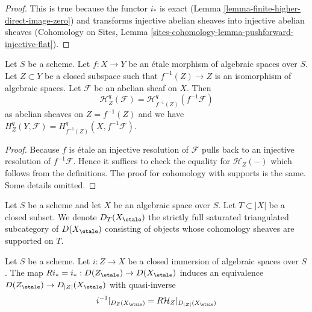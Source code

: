 \begin{proof}
This is true because the functor $i_*$ is exact
(Lemma \ref{lemma-finite-higher-direct-image-zero}) and transforms
injective abelian sheaves into injective abelian sheaves
(Cohomology on Sites, Lemma
\ref{sites-cohomology-lemma-pushforward-injective-flat}).
\end{proof}

\begin{lemma}
\label{lemma-etale-localization-sheaf-with-support}
Let $S$ be a scheme. Let $f : X \to Y$ be an \'etale morphism of
algebraic spaces over $S$. Let $Z \subset Y$ be a closed subspace
such that $f^{-1}(Z) \to Z$ is an isomorphism of algebraic spaces.
Let $\mathcal{F}$ be an abelian sheaf on $X$. Then
$$
\mathcal{H}^q_Z(\mathcal{F}) = \mathcal{H}^q_{f^{-1}(Z)}(f^{-1}\mathcal{F})
$$
as abelian sheaves on $Z = f^{-1}(Z)$ and we
have $H^q_Z(Y, \mathcal{F}) = H^q_{f^{-1}(Z)}(X, f^{-1}\mathcal{F})$.
\end{lemma}

\begin{proof}
Because $f$ is \'etale an injective resolution of $\mathcal{F}$
pulls back to an injective resolution of $f^{-1}\mathcal{F}$.
Hence it suffices to check the equality for $\mathcal{H}_Z(-)$
which follows from the definitions. The proof for cohomology with
supports is the same. Some details omitted.
\end{proof}

\noindent
Let $S$ be a scheme and let $X$ be an algebraic space over $S$.
Let $T \subset |X|$ be a closed subset.
We denote $D_T(X_\etale)$ the
strictly full saturated triangulated subcategory of $D(X_\etale)$
consisting of objects whose cohomology sheaves are supported on $T$.

\begin{lemma}
\label{lemma-complexes-with-support-on-closed}
Let $S$ be a scheme.
Let $i : Z \to X$ be a closed immersion of algebraic spaces over $S$.
The map $Ri_* = i_* : D(Z_\etale) \to D(X_\etale)$
induces an equivalence $D(Z_\etale) \to D_{|Z|}(X_\etale)$ with quasi-inverse
$$
i^{-1}|_{D_Z(X_\etale)} = R\mathcal{H}_Z|_{D_{|Z|}(X_\etale)}
$$
\end{lemma}

